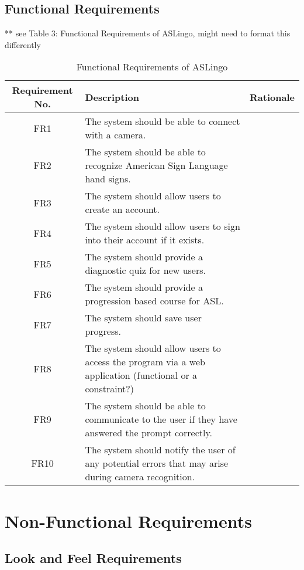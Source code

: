 \documentclass[12pt, titlepage]{article}
\begin{document}
\subsection{Functional Requirements}
 
** see Table 3: Functional Requirements of ASLingo, might need to format this differently \\

\begin{table}[H]
\caption{Functional Requirements of ASLingo}
\noindent \begin{tabular}{| c | p{4cm}| p{5cm}|}
\toprule 
\textbf{Requirement No.} & \textbf{Description} &\textbf{Rationale}\\
\midrule
FR1 & The system should be able to connect with a camera. & \\
\hline
FR2 & The system should be able to recognize American Sign Language hand signs. & \\
\hline
FR3 & The system should allow users to create an account. & \\
\hline
FR4 & The system should allow users to sign into their account if it exists. & \\
\hline
FR5 & The system should provide a diagnostic quiz for new users. & \\
\hline
FR6 & The system should provide a progression based course for ASL. & \\
\hline
FR7 & The system should save user progress. & \\
\hline
FR8 & The system should allow users to access the program via a web application (functional or a constraint?) & \\
\hline
FR9 & The system should be able to communicate to the user if they have answered the prompt correctly. & \\ 
\hline
FR10 & The system should notify the user of any potential errors that may arise during camera recognition. & \\
\bottomrule
\end{tabular}
\end{table}

\section{Non-Functional Requirements}

\subsection{Look and Feel Requirements}
\end{document}
